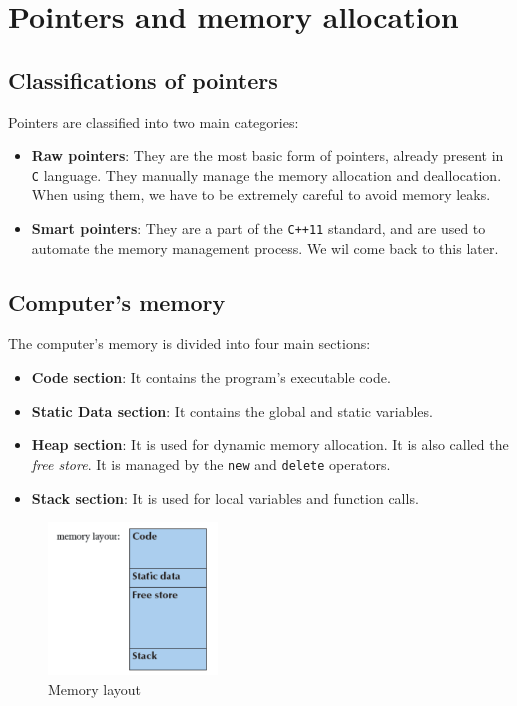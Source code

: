 \chapter{Pointers and memory allocation}

\section{Classifications of pointers}

Pointers are classified into two main categories:

\begin{itemize}
    \item \textbf{Raw pointers}: They are the most basic form of pointers, already present in \texttt{C} language. 
    They manually manage the memory allocation and deallocation.
    When using them, we have to be extremely careful to avoid memory leaks.
    \item \textbf{Smart pointers}: They are a part of the \texttt{C++11} standard, and are used to automate the memory management process.
    We wil come back to this later.
\end{itemize}

\section{Computer's memory}

The computer's memory is divided into four main sections:

\begin{itemize}
    \item \textbf{Code section}: It contains the program's executable code.
    \item \textbf{Static Data section}: It contains the global and static variables.
    \item \textbf{Heap section}: It is used for dynamic memory allocation. It is also called the \textit{free store}. It is
    managed by the \texttt{new} and \texttt{delete} operators.
    \item \textbf{Stack section}: It is used for local variables and function calls.
\end{itemize}

\begin{figure}[H]
    \centering
    \includegraphics[width=4.5cm]{figures/image_memory.png}
    \caption{Memory layout}
    \label{fig:memory}
\end{figure}

